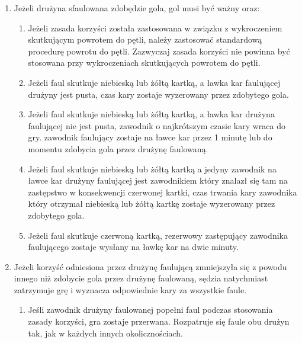 \documentclass[12pt]{article}
\begin{document}
\begin{enumerate}
\item
    Jeżeli drużyna sfaulowana zdobędzie gola, gol musi być ważny oraz:
  
  \begin{enumerate}
  \item
        Jeżeli zasada korzyści została zastosowana w związku z wykroczeniem
    skutkującym powrotem do pętli, należy zastosować standardową
    procedurę powrotu do pętli. Zazwyczaj zasada korzyści nie powinna
    być stosowana przy wykroczeniach skutkujących powrotem do pętli.
      \item
        Jeżeli faul skutkuje niebieską lub żółtą kartką, a ławka kar
    faulującej drużyny jest pusta, czas kary zostaje wyzerowany przez
    zdobytego gola.
      \item
        Jeżeli faul skutkuje niebieską lub żółtą kartką, a ławka kar drużyna
    faulującej nie jest pusta, zawodnik o najkrótszym czasie kary wraca
    do gry. zawodnik faulujący zostaje na ławce kar przez 1 minutę lub
    do momentu zdobycia gola przez drużynę faulowaną.
      \item
        Jeżeli faul skutkuje niebieską lub żółtą kartką a jedyny zawodnik na
    ławce kar drużyny faulującej jest zawodnikiem który znalazł się tam
    na zastępstwo w konsekwencji czerwonej kartki, czas trwania kary
    zawodnika który otrzymał niebieską lub żółtą kartkę zostaje
    wyzerowany przez zdobytego gola.
      \item
        Jeżeli faul skutkuje czerwoną kartką, rezerwowy zastępujący
    zawodnika faulującego zostaje wysłany na ławkę kar na dwie minuty.
      \end{enumerate}
\item
    Jeżeli korzyść odniesiona przez drużynę faulującą zmniejszyła się z
  powodu innego niż zdobycie gola przez drużynę faulowaną, sędzia
  natychmiast zatrzymuje grę i wyznacza odpowiednie kary za wszystkie
  faule.
  
  \begin{enumerate}
  \item
        Jeśli zawodnik drużyny faulowanej popełni faul podczas stosowania
    zasady korzyści, gra zostaje przerwana. Rozpatruje się faule obu
    drużyn tak, jak w każdych innych okolicznościach.
    

\end{enumerate}
\end{enumerate}
\end{document}
